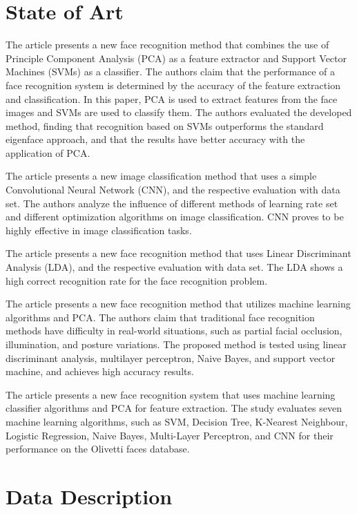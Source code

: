 \documentclass[conference]{IEEEtran}
\begin{document}
\section{State of Art}

The article \cite{5276938} presents a new face recognition method that combines the use of Principle Component Analysis (PCA) as a feature extractor and Support Vector Machines (SVMs) as a classifier. The authors claim that the performance of a face recognition system is determined by the accuracy of the feature extraction and classification. In this paper, PCA is used to extract features from the face images and SVMs are used to classify them. The authors evaluated the developed method, finding that recognition based on SVMs outperforms the standard eigenface approach, and that the results have better accuracy with the application of PCA.

The article \cite{8078730} presents a new image classification method that uses a simple Convolutional Neural Network (CNN), and the respective evaluation with data set. The authors analyze the influence of different methods of learning rate set and different optimization algorithms on image classification. CNN proves to be highly effective in image classification tasks.

The article \cite{bhattacharyya2013face} presents a new face recognition method that uses Linear Discriminant Analysis (LDA), and the respective evaluation with data set. The LDA shows a high correct recognition rate for the face recognition problem.

The article \cite{9137850} presents a new face recognition method that utilizes machine learning algorithms and PCA. The authors claim that traditional face recognition methods have difficulty in real-world situations, such as partial facial occlusion, illumination, and posture variations. The proposed method is tested using linear discriminant analysis, multilayer perceptron, Naive Bayes, and support vector machine, and achieves high accuracy results. 

The article \cite{9716171} presents a new face recognition system that uses machine learning classifier algorithms and PCA for feature extraction. The study evaluates seven machine learning algorithms, such as SVM, Decision Tree, K-Nearest Neighbour, Logistic Regression, Naive Bayes, Multi-Layer Perceptron, and CNN for their performance on the Olivetti faces database.

\section{Data Description}
\end{document}
